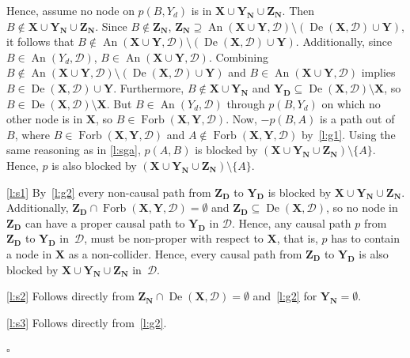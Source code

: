 \documentclass[11pt,a4paper]{article}
\newenvironment{proofof}[1][]{\begin{trivlist}
   \item[\hskip \labelsep {\bfseries Proof of #1.}]}{\hfill{}$\square$\end{trivlist}}
\DeclareMathOperator{\De}{De}
\DeclareMathOperator{\An}{An}
\DeclareMathOperator{\Forbi}{Forb}
\newcommand{\g}[1][G]{\mathcal{#1}}
\newcommand{\fb}[2][X,Y]{\Forbi(\mathbf{#1},#2)}%
\begin{document}
\begin{proofof}[Lemma~\ref{lemma:shpitser ynyd}]
\begin{enumerate}[label = (\alph*)]
Hence, assume no node on $p(B,Y_d)$ is in $\mathbf{X} \cup \mathbf{Y_N} \cup \mathbf{Z_N}$. Then $B \notin \mathbf{X} \cup \mathbf{Y_N} \cup \mathbf{Z_N}$. Since $B \notin \mathbf{Z_N}$, $\mathbf{Z_N} \supseteq \An(\mathbf{X} \cup \mathbf{Y},\g[D]) \setminus (\De(\mathbf{X},\g[D]) \cup \mathbf{Y})$, it follows that $B \notin \An(\mathbf{X} \cup \mathbf{Y},\g[D]) \setminus (\De(\mathbf{X},\g[D]) \cup \mathbf{Y})$. Additionally, since $B \in \An(Y_d,\g[D])$, $B \in \An(\mathbf{X} \cup \mathbf{Y},\g[D])$. Combining $B \notin \An(\mathbf{X} \cup \mathbf{Y},\g[D]) \setminus (\De(\mathbf{X},\g[D]) \cup \mathbf{Y})$ and $B \in \An(\mathbf{X} \cup \mathbf{Y},\g[D])$ implies $B \in \De(\mathbf{X},\g[D]) \cup \mathbf{Y}$. Furthermore, $B \notin \mathbf{X} \cup \mathbf{Y_N}$ and $\mathbf{Y_D} \subseteq \De(\mathbf{X},\g[D]) \setminus \mathbf{X}$, so $B \in \De(\mathbf{X},\g[D]) \setminus \mathbf{X}$. But $B \in \An(Y_d,\g[D])$ through $p(B,Y_d)$ on which no other node is in $\mathbf{X}$, so $B \in \fb{\g[D]}$. Now, $-p(B,A)$ is a path out of $B$, where $B \in \fb{\g[D]}$ and $A \notin \fb{\g[D]}$ by~\ref{l:g1}. Using the same reasoning as in \ref{l:sga}, $p(A,B)$ is blocked by $(\mathbf{X} \cup \mathbf{Y_N} \cup \mathbf{Z_N}) \setminus \{A\}$. Hence, $p$ is also blocked by $(\mathbf{X} \cup \mathbf{Y_N} \cup \mathbf{Z_N}) \setminus \{A\}$.
\end{enumerate}

\ref{l:s1} By~\ref{l:g2} every non-causal path from $\mathbf{Z_D}$ to $\mathbf{Y_D}$ is blocked by $\mathbf{X} \cup \mathbf{Y_N} \cup \mathbf{Z_N}$. 
Additionally, $\mathbf{Z_D} \cap \fb{\g[D]} = \emptyset$ and  $\mathbf{Z_D} \subseteq \De(\mathbf{X},\g[D])$, so no node in $\mathbf{Z_D}$ can have a proper causal path to $\mathbf{Y_D}$ in $\g[D]$. Hence, any causal path $p$ from $\mathbf{Z_D}$ to $\mathbf{Y_D}$ in~$\g[D]$, must be non-proper with respect to $\mathbf{X}$, that is, $p$ has to contain a node in $\mathbf{X}$ as a non-collider. Hence, every causal path from $\mathbf{Z_D}$ to $\mathbf{Y_D}$ is also blocked by $\mathbf{X} \cup \mathbf{Y_N} \cup \mathbf{Z_N}$ in~$\g[D]$.

\ref{l:s2} Follows directly from $\mathbf{Z_N} \cap \De(\mathbf{X},\g[D]) = \emptyset$ and~\ref{l:g2} for $\mathbf{Y_N} = \emptyset$.

\ref{l:s3} Follows directly from~\ref{l:g2}.


\end{proofof}
\end{document}
